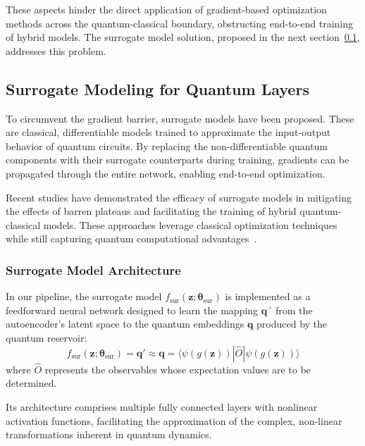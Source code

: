 \documentclass[conference]{IEEEtran}
\begin{document}
These aspects hinder the direct application of 
gradient-based optimization methods across the 
quantum-classical boundary, obstructing end-to-end 
training of hybrid models. The surrogate model 
solution, proposed in the next section~\ref{surrogate_modeling_for_quantum_layers}, addresses 
this problem.


\subsection{Surrogate Modeling for Quantum Layers} \label{surrogate_modeling_for_quantum_layers}
To circumvent the gradient barrier, surrogate models 
have been proposed. These are classical, differentiable 
models trained to approximate the input-output behavior 
of quantum circuits. By replacing the non-differentiable 
quantum components with their surrogate counterparts during 
training, gradients can be propagated through the entire network, 
enabling end-to-end optimization. 

Recent studies have demonstrated the efficacy of surrogate models in mitigating the effects of barren plateaus and facilitating the training of hybrid quantum-classical models. These approaches leverage
classical optimization techniques while still capturing quantum computational advantages~\cite{xieQuantumSurrogateDrivenImage2025a}.


\subsubsection{Surrogate Model Architecture}
In our pipeline, the surrogate model \( f_{\text{sur}}(\bm{z}; \bm\theta_{\text{sur}}) \) is implemented as a feedforward neural network designed to learn the mapping $\bm q´$ from the autoencoder's latent space to the quantum embeddings $\bm q$ produced by the quantum reservoir:
\begin{equation}
    f_{\text{sur}}(\bm{z}; \bm\theta_{\text{sur}}) = \bm{q}' \approx \bm{q} =  \langle \psi(g(\bm{z}))| \hat{O} |\psi(g(\bm{z}))\rangle
\end{equation}
where \(\hat{O}\) represents the observables whose expectation values are to be determined.

Its architecture comprises multiple fully connected layers with nonlinear activation functions, facilitating the approximation of the complex, non-linear transformations inherent in quantum dynamics.
\end{document}
